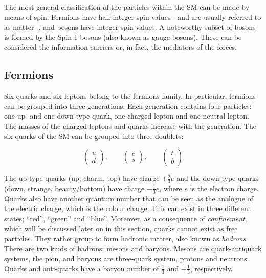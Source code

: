 
		The most general classification of the particles within the SM can be made by means of spin. Fermions have half-integer spin values - and are usually referred to as matter -, and bosons have integer-spin values. A noteworthy subset of bosons is formed by the Spin-1 bosons (also known as gauge bosons). These can be considered the information carriers or, in fact, the mediators of the forces. 



		\subsection*{Fermions}

			Six quarks and six leptons belong to the fermions family. In particular, fermions can be grouped into three generations. Each generation contains four particles; one up- and one down-type quark, one charged lepton and one neutral lepton. The masses of the charged leptons and quarks increase with the generation. The six quarks of the SM can be grouped into three doublets:

			\begin{equation*}
			\label{eq:quark_doublets}
				\begin{pmatrix} u \\ d \end{pmatrix}, \qquad 
				\begin{pmatrix} c \\ s \end{pmatrix}, \qquad 
				\begin{pmatrix} t \\ b \end{pmatrix}
			\end{equation*}

			\noindent The up-type quarks (up, charm, top) have charge $+\frac{2}{3}e$ and the down-type quarks (down, strange, beauty/bottom) have charge $-\frac{1}{3}e$, where $e$ is the electron charge. Quarks also have another quantum number that can be seen as the analogue of the electric charge, which is the colour charge. This can exist in three different states; ``red'', ``green'' and ``blue''. Moreover, as a consequence of \emph{confinement}, which will be discussed later on in this section, quarks cannot exist as free particles. They rather group to form hadronic matter, also known as \emph{hadrons}. There are two kinds of hadrons; mesons and baryons. Mesons are quark-antiquark systems, \eg the pion, and baryons are three-quark system, \eg protons and neutrons. Quarks and anti-quarks have a baryon number of $\frac{1}{3}$ and $-\frac{1}{3}$, respectively.

